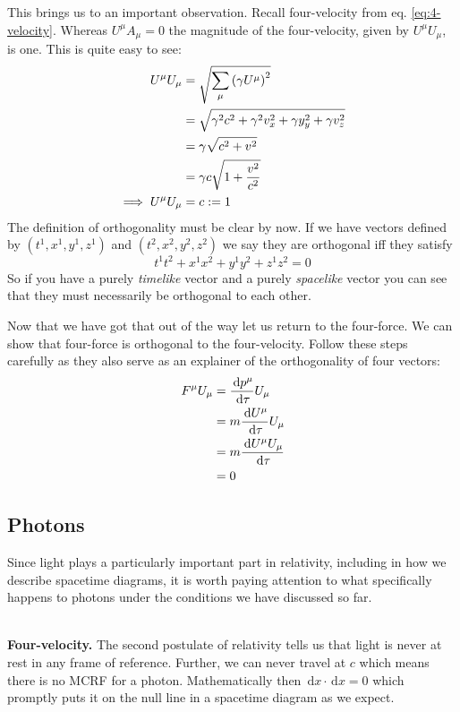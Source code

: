\documentclass[english,seminar]{lecture}
\newcommand{\diff}{\,\textrm{d}}
\begin{document}
This brings us to an important observation. Recall four-velocity from eq. \eqref{eq:4-velocity}. Whereas $U^\mu A_\mu = 0$ the magnitude of the four-velocity, given by $U^\mu U_\mu$, is one. This is quite easy to see:
\begin{align*}
	U^\mu U_\mu &= \sqrt{\sum_\mu \left( \gamma U^\mu \right)^2 } \\
				&= \sqrt{\gamma^2c^2 + \gamma^2v_x^2 + \gamma y_y^2 + \gamma v_z^2 } \\
				&= \gamma \sqrt{c^2 + v^2} \\
				&= \gamma c \sqrt{1 + {v^2\over c^2}} \\
\implies U^\mu U_\mu &= c := 1
\end{align*}%
The definition of orthogonality must be clear by now. If we have vectors defined by $(t^1,x^1,y^1,z^1)$ and $(t^2,x^2,y^2,z^2)$ we say they are orthogonal iff they satisfy $$t^1t^2 + x^1x^2 + y^1y^2 + z^1z^2 = 0$$ So if you have a purely \textit{timelike} vector and a purely \textit{spacelike} vector you can see that they must necessarily be orthogonal to each other.

Now that we have got that out of the way let us return to the four-force. We can show that four-force is orthogonal to the four-velocity. Follow these steps carefully as they also serve as an explainer of the orthogonality of four vectors:
\begin{align*}
	F^\mu U_\mu &= {\diff p^\mu \over \diff \tau} U_\mu \\
				&= m {\diff U^\mu \over \diff \tau} U_\mu \\
				&= m {\diff U^\mu U_\mu \over \diff \tau} \\
				&= 0
\end{align*}

\subsection{Photons}

Since light plays a particularly important part in relativity, including in how we describe spacetime diagrams, it is worth paying attention to what specifically happens to photons under the conditions we have discussed so far.

\\\textbf{Four-velocity.} The second postulate of relativity tells us that light is never at rest in any frame of reference. Further, we can never travel at $c$ which means there is no MCRF for a photon. Mathematically then $\diff x\cdot\diff x = 0$ which promptly puts it on the null line in a spacetime diagram as we expect.
\end{document}
